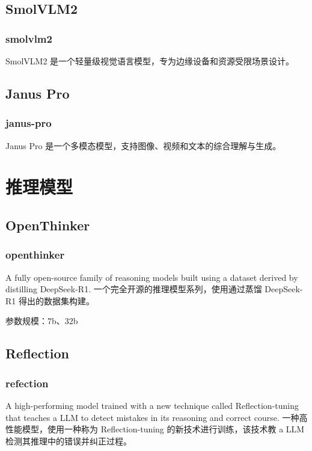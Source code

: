 \documentclass[12pt,UTF8]{ctexbook}
\begin{document}
\section{SmolVLM2}

\subsection{smolvlm2}

SmolVLM2 是一个轻量级视觉语言模型，专为边缘设备和资源受限场景设计。

\section{Janus Pro}

\subsection{janus-pro}

Janus Pro 是一个多模态模型，支持图像、视频和文本的综合理解与生成。

\chapter{推理模型}

\section{OpenThinker}

\subsection{openthinker}

A fully open-source family of reasoning models built using a dataset derived by distilling DeepSeek-R1.
一个完全开源的推理模型系列，使用通过蒸馏 DeepSeek-R1 得出的数据集构建。

参数规模：7b、32b

\section{Reflection}

\subsection{refection}

A high-performing model trained with a new technique called Reflection-tuning that teaches a LLM to detect mistakes in its reasoning and correct course.
一种高性能模型，使用一种称为 Reflection-tuning 的新技术进行训练，该技术教 a LLM 检测其推理中的错误并纠正过程。
\end{document}
